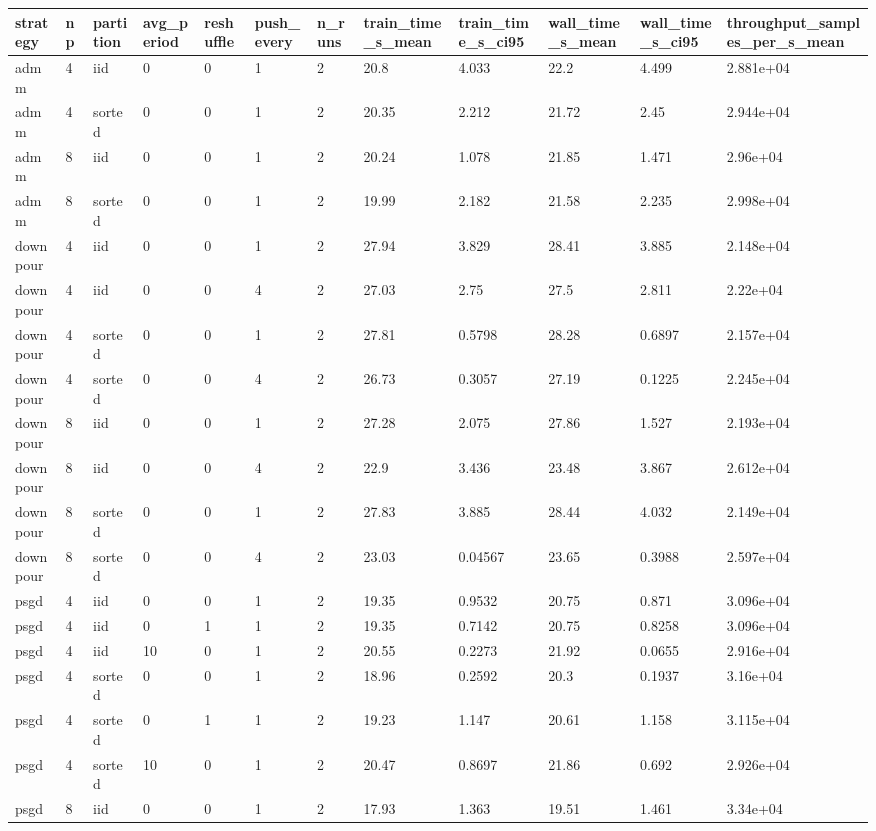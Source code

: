 \begin{tabular}{llllllllllll}
\hline
strategy & np & partition & avg\_period & reshuffle & push\_every & n\_runs & train\_time\_s\_mean & train\_time\_s\_ci95 & wall\_time\_s\_mean & wall\_time\_s\_ci95 & throughput\_samples\_per\_s\_mean \\
\hline
admm & 4 & iid & 0 & 0 & 1 & 2 & 20.8 & 4.033 & 22.2 & 4.499 & 2.881e+04 \\
admm & 4 & sorted & 0 & 0 & 1 & 2 & 20.35 & 2.212 & 21.72 & 2.45 & 2.944e+04 \\
admm & 8 & iid & 0 & 0 & 1 & 2 & 20.24 & 1.078 & 21.85 & 1.471 & 2.96e+04 \\
admm & 8 & sorted & 0 & 0 & 1 & 2 & 19.99 & 2.182 & 21.58 & 2.235 & 2.998e+04 \\
downpour & 4 & iid & 0 & 0 & 1 & 2 & 27.94 & 3.829 & 28.41 & 3.885 & 2.148e+04 \\
downpour & 4 & iid & 0 & 0 & 4 & 2 & 27.03 & 2.75 & 27.5 & 2.811 & 2.22e+04 \\
downpour & 4 & sorted & 0 & 0 & 1 & 2 & 27.81 & 0.5798 & 28.28 & 0.6897 & 2.157e+04 \\
downpour & 4 & sorted & 0 & 0 & 4 & 2 & 26.73 & 0.3057 & 27.19 & 0.1225 & 2.245e+04 \\
downpour & 8 & iid & 0 & 0 & 1 & 2 & 27.28 & 2.075 & 27.86 & 1.527 & 2.193e+04 \\
downpour & 8 & iid & 0 & 0 & 4 & 2 & 22.9 & 3.436 & 23.48 & 3.867 & 2.612e+04 \\
downpour & 8 & sorted & 0 & 0 & 1 & 2 & 27.83 & 3.885 & 28.44 & 4.032 & 2.149e+04 \\
downpour & 8 & sorted & 0 & 0 & 4 & 2 & 23.03 & 0.04567 & 23.65 & 0.3988 & 2.597e+04 \\
psgd & 4 & iid & 0 & 0 & 1 & 2 & 19.35 & 0.9532 & 20.75 & 0.871 & 3.096e+04 \\
psgd & 4 & iid & 0 & 1 & 1 & 2 & 19.35 & 0.7142 & 20.75 & 0.8258 & 3.096e+04 \\
psgd & 4 & iid & 10 & 0 & 1 & 2 & 20.55 & 0.2273 & 21.92 & 0.0655 & 2.916e+04 \\
psgd & 4 & sorted & 0 & 0 & 1 & 2 & 18.96 & 0.2592 & 20.3 & 0.1937 & 3.16e+04 \\
psgd & 4 & sorted & 0 & 1 & 1 & 2 & 19.23 & 1.147 & 20.61 & 1.158 & 3.115e+04 \\
psgd & 4 & sorted & 10 & 0 & 1 & 2 & 20.47 & 0.8697 & 21.86 & 0.692 & 2.926e+04 \\
psgd & 8 & iid & 0 & 0 & 1 & 2 & 17.93 & 1.363 & 19.51 & 1.461 & 3.34e+04 \\

\end{tabular}
